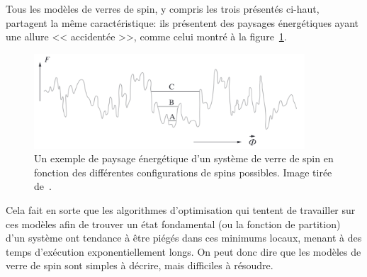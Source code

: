 Tous les modèles de verres de spin, y compris les trois présentés ci-haut, partagent la même caractéristique: ils présentent des paysages énergétiques ayant une allure << accidentée >>, comme celui montré à la figure~\ref{fig:spin-glass-rugged-energy-landscape}. %
\begin{figure}[h]
    \centering
    \includegraphics[width=0.9\textwidth]{Figures/spin-glass-rugged-energy-landscape.png}
    \caption[Un exemple de paysage énergétique d'un système de verre de spin. Les multiples minimums locaux font en sorte que les algorithmes prennent du temps à résoudre le problème.]{Un exemple de paysage énergétique d'un système de verre de spin en fonction des différentes configurations de spins possibles. Image tirée de~\protect\cite{stein2013spin}.}
    \label{fig:spin-glass-rugged-energy-landscape}
\end{figure}
Cela fait en sorte que les algorithmes d'optimisation qui tentent de travailler sur ces modèles afin de trouver un état fondamental (ou la fonction de partition) d'un système ont tendance à être piégés dans ces minimums locaux, menant à des temps d'exécution exponentiellement longs.
On peut donc dire que les modèles de verre de spin sont simples à décrire, mais difficiles à résoudre.


